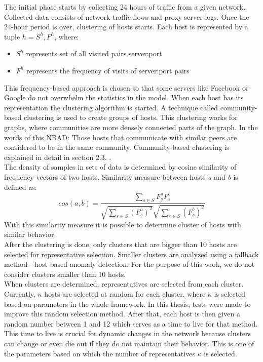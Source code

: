 \documentclass[thesis=B,english]{FITthesis}[2012/10/20]
\begin{document}
The initial phase starts by collecting 24 hours of traffic from a given network.
Collected data consists of network traffic flows and proxy server logs.
Once the 24-hour period is over, clustering of hosts starts.
Each host is represented by a tuple $h = {S^h, F^h}$, where:
\begin{itemize}
    \item $S^h$ represents set of all visited pairs server:port
    \item $F^h$ represents the frequency of visits of server:port pairs
\end{itemize}
This frequency-based approach is chosen so that some servers like Facebook or Google do not overwhelm the statistics in the model.
When each host has its representation the clustering algorithm is started.
A technique called community-based clustering is used to create groups of hosts.
This clustering works for graphs, where communities are more densely connected parts of the graph.
In the words of this NBAD: Those hosts that communicate with similar peers are considered to be in the same community.
Community-based clustering is explained in detail in section 2.3. . \\

The density of samples in sets of data is determined by cosine similarity of frequency vectors of two hosts.
Similarity measure between hosts \textit{a} and \textit{b} is defined as:
$$cos(a, b) = \frac{\sum_{s \in S} F_s^a F_s^b} {\sqrt{\sum_{s \in S} (F_s^a)^2} \sqrt{\sum_{s \in S} (F_s^b)^2}}$$
With this similarity measure it is possible to determine cluster of hosts with similar behavior. \\

After the clustering is done, only clusters that are bigger than 10 hosts are selected for representative selection.
Smaller clusters are analyzed using a fallback method - host-based anomaly detection.
For the purpose of this work, we do not consider clusters smaller than 10 hosts. \\

When clusters are determined, representatives are selected from each cluster.
Currently, $\kappa$ hosts are selected at random for each cluster, where $\kappa$ is selected based on parameters in the whole framework.
In this thesis, tests were made to improve this random selection method.
After that, each host is then given a random number between 1 and 12 which serves as a time to live for that method.
This time to live is crucial for dynamic changes in the network because clusters can change or even die out if they do not maintain their behavior.
This is one of the parameters based on which the number of representatives $\kappa$ is selected. \\
\end{document}
